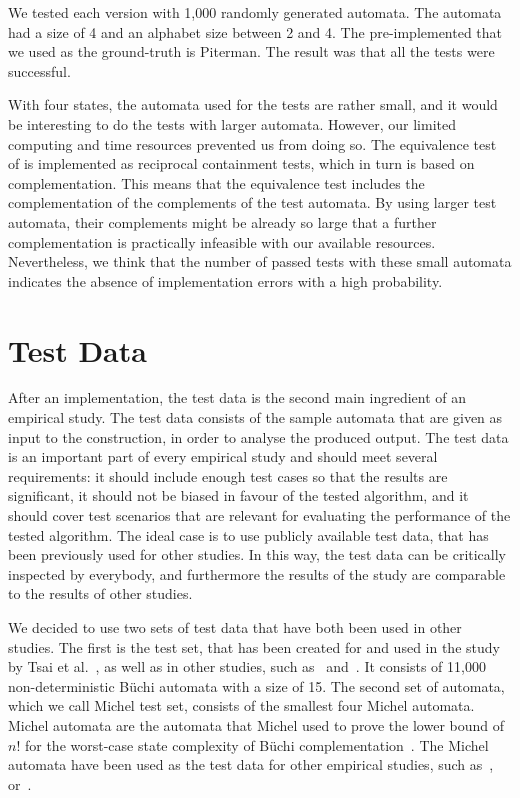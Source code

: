 We tested each version with 1,000 randomly generated automata. The automata had a size of 4 and an alphabet size between 2 and 4. The pre-implemented that we used as the ground-truth is Piterman. The result was that all the tests were successful. 

With four states, the automata used for the tests are rather small, and it would be interesting to do the tests with larger automata. However, our limited computing and time resources prevented us from doing so. The equivalence test of \goal{} is implemented as reciprocal containment tests, which in turn is based on complementation. This means that the equivalence test includes the complementation of the complements of the test automata. By using larger test automata, their complements might be already so large that a further complementation is practically infeasible with our available resources. Nevertheless, we think that the number of passed tests with these small automata indicates the absence of implementation errors with a high probability.


\section{Test Data}
\label{4_test_data}
After an implementation, the test data is the second main ingredient of an empirical study. The test data consists of the sample automata that are given as input to the construction, in order to analyse the produced output. The test data is an important part of every empirical study and should meet several requirements: it should include enough test cases so that the results are significant, it should not be biased in favour of the tested algorithm, and it should cover test scenarios that are relevant for evaluating the performance of the tested algorithm. The ideal case is to use publicly available test data, that has been previously used for other studies. In this way, the test data can be critically inspected by everybody, and furthermore the results of the study are comparable to the results of other studies.

We decided to use two sets of test data that have both been used in other studies. The first is the \goal{} test set, that has been created for and used in the study by Tsai et al.~\cite{2011_tsai}, as well as in other studies, such as~\cite{2012_breuers} and~\cite{2013_bsc_goettel}. It consists of 11,000 non-deterministic Büchi automata with a size of 15. The second set of automata, which we call Michel test set, consists of the smallest four Michel automata. Michel automata are the automata that Michel used to prove the lower bound of $n!$ for the worst-case state complexity of Büchi complementation~\cite{michel1988}. The Michel automata have been used as the test data for other empirical studies, such as~\cite{2006_althoff}, or~\cite{2013_bsc_goettel}. 


